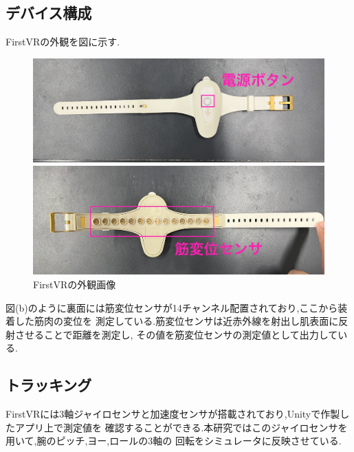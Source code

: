 \documentclass{ltjsreport}
\begin{document}
		\subsection{デバイス構成}
				FirstVRの外観を図に示す.
				\begin{figure}[H]
				\centering
				\begin{minipage}{0.75\columnwidth}
				\centering
				\includegraphics[width = \columnwidth]{../figs/IMG_0337.JPG}
				\end{minipage}
				\hspace{0.04\columnwidth}
				\begin{minipage}{0.75\columnwidth}
				\centering
				\includegraphics[width = \columnwidth]{../figs/IMG_0336.JPG}
				\end{minipage}
				\caption{FirstVRの外観画像}
				\label{fig:FirstVR}
				\end{figure}
\vspace{-15pt}

			図(b)のように裏面には筋変位センサが14チャンネル配置されており,ここから装着した筋肉の変位を
			測定している.筋変位センサは近赤外線を射出し肌表面に反射させることで距離を測定し,
			その値を筋変位センサの測定値として出力している.

		\subsection{トラッキング}
			FirstVRには3軸ジャイロセンサと加速度センサが搭載されており,Unityで作製したアプリ上で測定値を
			確認することができる.本研究ではこのジャイロセンサを用いて,腕のピッチ,ヨー,ロールの3軸の
			回転をシミュレータに反映させている.
\end{document}
